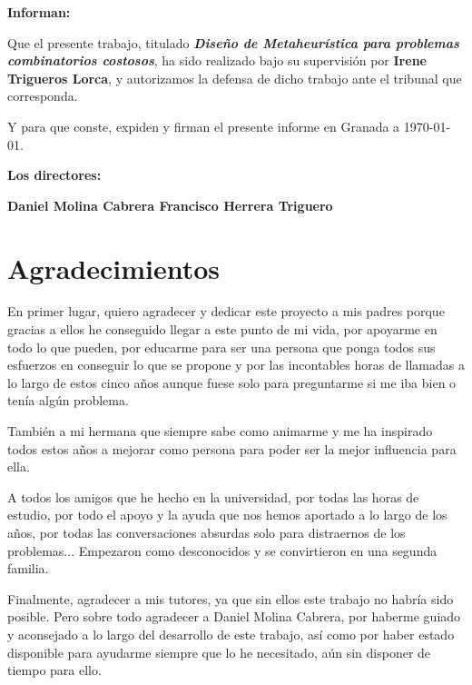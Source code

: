 \vspace{0.5cm}

\textbf{Informan:}

\vspace{0.5cm}

Que el presente trabajo, titulado \textit{\textbf{Diseño de Metaheurística para problemas combinatorios costosos}},
ha sido realizado bajo su supervisión por \textbf{Irene Trigueros Lorca}, y autorizamos la defensa de dicho trabajo ante el tribunal
que corresponda.

\vspace{0.5cm}

Y para que conste, expiden y firman el presente informe en Granada a \today.

\vspace{1cm}

\textbf{Los directores:}

\vspace{5cm}

\noindent \textbf{Daniel Molina Cabrera \hspace{5cm} Francisco Herrera Triguero}

\chapter*{Agradecimientos}
\thispagestyle{empty}

       \vspace{1cm}


En primer lugar, quiero agradecer y dedicar este proyecto a mis padres porque gracias a ellos he conseguido llegar a este punto de mi vida, por apoyarme en todo lo que pueden, por educarme para ser una persona que ponga todos sus esfuerzos en conseguir lo que se propone y por las incontables horas de llamadas a lo largo de estos cinco años aunque fuese solo para preguntarme si me iba bien o tenía algún problema. 

También a mi hermana que siempre sabe como animarme y me ha inspirado todos estos años a mejorar como persona para poder ser la mejor influencia para ella. 

A todos los amigos que he hecho en la universidad, por todas las horas de estudio, por todo el apoyo y la ayuda que nos hemos aportado a lo largo de los años, por todas las conversaciones absurdas solo para distraernos de los problemas... 
Empezaron como desconocidos y se convirtieron en una segunda familia. 

Finalmente, agradecer a mis tutores, ya que sin ellos este trabajo no habría sido posible. 
Pero sobre todo agradecer a Daniel Molina Cabrera, por haberme guiado y aconsejado a lo largo del desarrollo de este trabajo, así como por haber estado disponible para ayudarme siempre que lo he necesitado, aún sin disponer de tiempo para ello. 